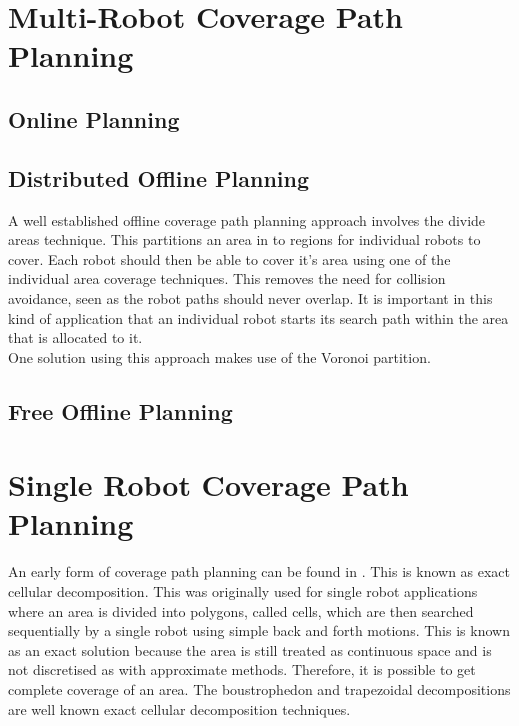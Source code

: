 \section{Multi-Robot Coverage Path Planning}
\subsection{Online Planning}

\subsection{Distributed Offline Planning}
A well established offline coverage path planning approach involves the divide areas technique. This partitions an area in to regions for individual robots to cover. Each robot should then be able to cover it's area using one of the individual area coverage techniques. This removes the need for collision avoidance, seen as the robot paths should never overlap. It is important in this kind of application that an individual robot starts its search path within the area that is allocated to it. \\

One solution using this approach makes use of the Voronoi partition.
\subsection{Free Offline Planning}

\section{Single Robot Coverage Path Planning}
An early form of coverage path planning can be found in \cite{Choset2001}. This is known as exact cellular decomposition. This was originally used for single robot applications where an area is divided into polygons, called cells, which are then searched sequentially by a single robot using simple back and forth motions. This is known as an exact solution because the area is still treated as continuous space and is not discretised as with approximate methods. Therefore, it is possible to get complete coverage of an area. The boustrophedon and trapezoidal decompositions are well known exact cellular decomposition techniques.\\
